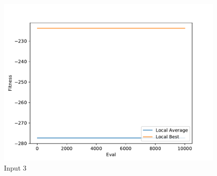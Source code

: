 \documentclass{standalone}
\begin{document}
\begin{figure}[!htb]
	\caption{Input 3}
	\label{fig:graph_3011}
	\includegraphics[width=\textwidth]{../graphs/graphs/3011.pdf}
\end{figure}
\end{document}
